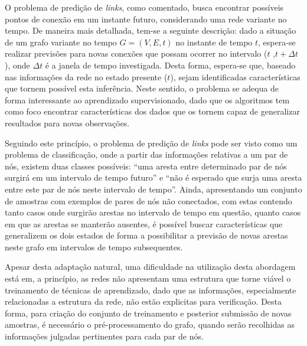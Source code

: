 \documentclass[a4paper,11pt]{article}
\begin{document}

O problema de predição de \textit{links}, como comentado, busca encontrar possíveis pontos de conexão em um instante futuro, considerando uma rede variante no tempo. De maneira mais detalhada, tem-se a seguinte descrição: dado a situação de um grafo variante no tempo $G=(V,E,t)$ no instante de tempo $t$, espera-se realizar previsões para novas conexões que possam ocorrer no intervalo ($t$ ,$t+\Delta t$), onde $\Delta t$ é a janela de tempo investigada. Desta forma, espera-se que, baseado nas informações da rede no estado presente ($t$), sejam identificadas características que tornem possível esta inferência. Neste sentido, o problema se adequa de forma interessante ao aprendizado supervisionado, dado que os algoritmos tem como foco encontrar características dos dados que os tornem capaz de generalizar resultados para novas observações. 


Seguindo este princípio, o problema de predição de \textit{links} pode ser visto como um problema de classificação, onde a partir das informações relativas a um par de nós, existem duas classes possíveis: ``uma aresta entre determinado par de nós surgirá em um intervalo de tempo futuro'' e ``não é esperado que surja uma aresta entre este par de nós neste intervalo de tempo''. Ainda, apresentando um conjunto de amostras com exemplos de pares de nós não conectados, com estas contendo tanto casos onde surgirão arestas no intervalo de tempo em questão, quanto casos em que as arestas se manterão ausentes, é possível buscar características que generalizem os dois estados de forma a possibilitar a previsão de novas arestas neste grafo em intervalos de tempo subsequentes.

Apesar desta adaptação natural, uma dificuldade na utilização desta abordagem está em, a princípio, as redes não apresentam uma estrutura que torne viável o treinamento de técnicas de aprendizado, dado que as informações, especialmente relacionadas a estrutura da rede, não estão explicitas para verificação. 
Desta forma, para criação do conjunto de treinamento e posterior submissão de novas amostras, é necessário o pré-processamento do grafo, quando serão recolhidas as informações julgadas pertinentes para cada par de nós. 
\end{document}
